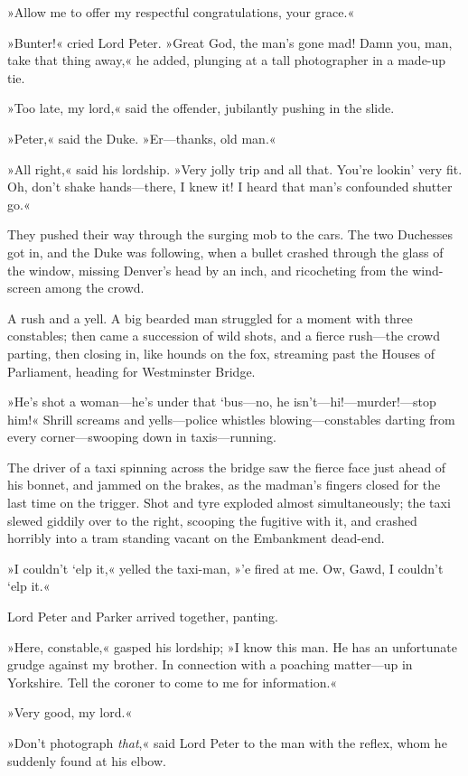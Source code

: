 »Allow me to offer my respectful congratulations, your grace.«

»Bunter!« cried Lord Peter. »Great God, the man's gone mad! Damn you, man, take that thing away,« he added, plunging at a tall photographer in a made-up tie.

»Too late, my lord,« said the offender, jubilantly pushing in the slide.

»Peter,« said the Duke. »Er—thanks, old man.«

»All right,« said his lordship. »Very jolly trip and all that. You're lookin' very fit. Oh, don't shake hands—there, I knew it! I heard that man's confounded shutter go.«

They pushed their way through the surging mob to the cars. The two Duchesses got in, and the Duke was following, when a bullet crashed through the glass of the window, missing Denver's head by an inch, and ricocheting from the wind-screen among the crowd.

A rush and a yell. A big bearded man struggled for a moment with three constables; then came a succession of wild shots, and a fierce rush—the crowd parting, then closing in, like hounds on the fox, streaming past the Houses of Parliament, heading for Westminster Bridge.

»He's shot a woman—he's under that `bus—no, he isn't—hi!—murder!—stop him!« Shrill screams and yells—police whistles blowing—constables darting from every corner—swooping down in taxis—running.

The driver of a taxi spinning across the bridge saw the fierce face just ahead of his bonnet, and jammed on the brakes, as the madman's fingers closed for the last time on the trigger. Shot and tyre exploded almost simultaneously; the taxi slewed giddily over to the right, scooping the fugitive with it, and crashed horribly into a tram standing vacant on the Embankment dead-end.

»I couldn't `elp it,« yelled the taxi-man, »'e fired at me. Ow, Gawd, I couldn't `elp it.«

Lord Peter and Parker arrived together, panting.

»Here, constable,« gasped his lordship; »I know this man. He has an unfortunate grudge against my brother. In connection with a poaching matter—up in Yorkshire. Tell the coroner to come to me for information.«

»Very good, my lord.«

»Don't photograph \textit{that},« said Lord Peter to the man with the reflex, whom he suddenly found at his elbow.

